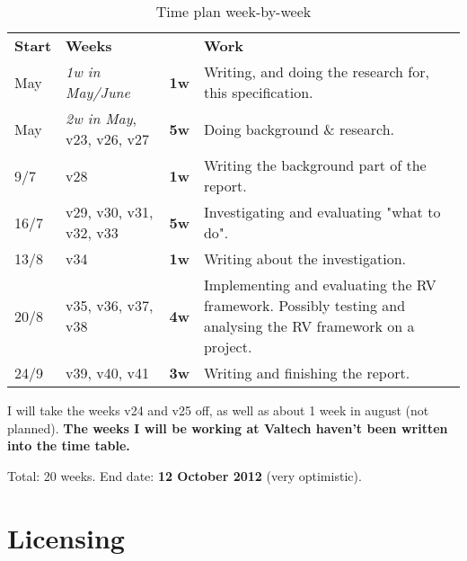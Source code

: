 \documentclass[a4paper,11pt]{article}
\begin{document}
\begin{center}
	\renewcommand{\arraystretch}{1.5}
	\begin{table}[h!b!p!]
	
	\begin{tabular}{ l | l l | p{8cm} }
		
		\textbf{Start} & \textbf{Weeks} &  & \textbf{Work} \\
		\noalign{\smallskip}\hline\noalign{\smallskip}
		
		May & \textit{1w in May/June} & \textbf{1w} &
		Writing, and doing the research for, this specification.
		\\
		
		May & \textit{2w in May}, v23\footnotemark[1], v26, v27 & \textbf{5w} &
		Doing background \& research.
		\\
		
		9/7 & v28 & \textbf{1w} &
		Writing the background part of the report.
		\\
		
		16/7 & v29, v30, v31, v32, v33 & \textbf{5w} &
		Investigating and evaluating "what to do".
		\\
		
		13/8 & v34& \textbf{1w} &
		Writing about the investigation.
		\\
		
		20/8 & v35, v36, v37, v38 & \textbf{4w} &
		Implementing and evaluating the RV framework.
		Possibly testing and analysing the RV framework on a project.
		\\
		
		24/9 & v39, v40, v41 & \textbf{3w} &
		Writing and finishing the report.
		\\
		
	\end{tabular}
	\caption{Time plan week-by-week}
	\end{table}
\end{center}


I will take the weeks v24 and v25 off, as well as about 1 week in august (not planned).
\textbf{The weeks I will be working at Valtech haven't been written into the time table.}

Total: 20 weeks. End date: \textbf{12 October 2012} (very optimistic).

\section{Licensing}
\end{document}
